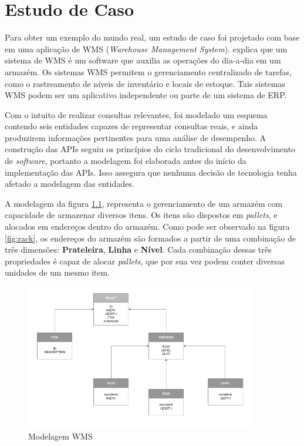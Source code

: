 \chapter[Estudo de Caso]{Estudo de Caso}\label{cap:estudo}

Para obter um exemplo do mundo real, um estudo de caso foi projetado com base em uma aplicação de WMS (\textit{Warehouse Management System}).  explica que um sistema de WMS é um software que auxilia as operações do dia-a-dia em um armazém. Os sistemas WMS permitem o gerenciamento centralizado de tarefas, como o rastreamento de níveis de inventário e locais de estoque. Tais sistemas WMS podem ser um aplicativo independente ou parte de um sistema de ERP.

Com o intuito de realizar consultas relevantes, foi modelado um esquema contendo seis entidades capazes de representar consultas reais, e ainda produzirem informações pertinentes para uma análise de desempenho. A construção das APIs seguiu os princípios do ciclo tradicional do desenvolvimento de \textit{software}, portanto a modelagem foi elaborada antes do início da implementação das APIs. Isso assegura que nenhuma decisão de tecnologia tenha afetado a modelagem das entidades.

A modelagem da figura \ref{fig:modelagem}, representa o gerenciamento de um armazém com capacidade de armazenar diversos itens. Os itens são dispostos em \textit{pallets}, e alocados em endereços dentro do armazém. Como pode ser observado na figura \ref{fig:rack}, os endereços do armazém são formados a partir de uma combinação de três dimensões: \textbf{Prateleira}, \textbf{Linha} e \textbf{Nível}. Cada combinação dessas três propriedades é capaz de alocar \textit{pallets}, que por sua vez podem conter diversas unidades de um mesmo item.

\begin{figure}[htbp]
\centering
\includegraphics[width=0.9\textwidth]{figuras/model.png}
\caption{Modelagem WMS}
\label{fig:modelagem}
\end{figure}

